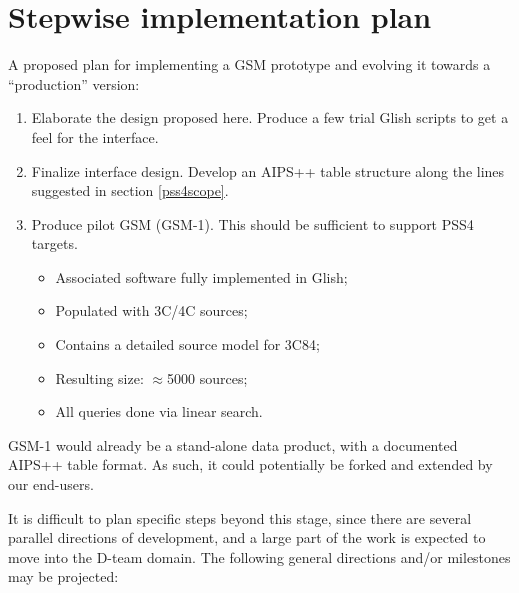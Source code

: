 \documentclass[10pt]{article}
\begin{document}
\section{Stepwise implementation plan}

A proposed plan for implementing a GSM prototype and evolving it towards a
``production'' version:

\begin{enumerate}

\item Elaborate the design proposed here. Produce a few trial Glish scripts to
get a feel for the interface.

\item Finalize interface design. Develop an AIPS++ table structure along the
lines suggested in section \ref{pss4scope}.

\item Produce pilot GSM (GSM-1). This should be sufficient to 
support PSS4 targets.

\begin{itemize}
\item Associated software fully implemented in Glish;
\item Populated with 3C/4C sources;
\item Contains a detailed source model for 3C84;
\item Resulting size: $\approx$5000 sources;
\item All queries done via linear search.
\end{itemize}

\end{enumerate}

GSM-1 would already be a stand-alone data product, with a documented AIPS++
table format. As such, it could potentially be forked and extended by our
end-users.

It is difficult to plan specific steps beyond this stage, since there are
several parallel directions of development, and a large part of the work is
expected to move into the D-team domain. The following general directions
and/or milestones may be projected:
\end{document}
